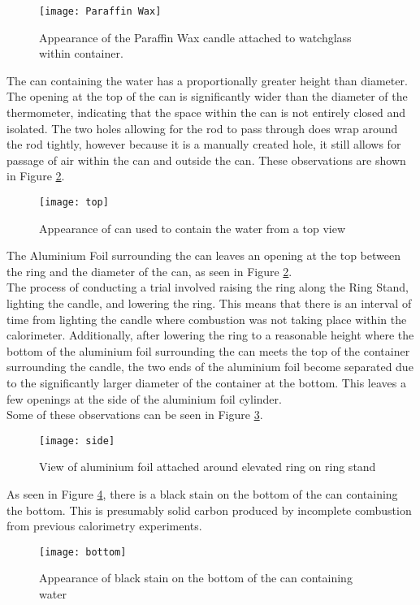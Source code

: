 \documentclass[
	letterpaper, %
	12pt, %
]{CSUniSchoolLabReport}
\begin{document}
\begin{figure}[H] %
    \centering %
    \texttt{[image: Paraffin Wax]} %
    \caption{Appearance of the Paraffin Wax candle attached to watchglass within container.}
    \label{fig:paraffin}
\end{figure}

The can containing the water has a proportionally greater height than diameter.
The opening at the top of the can is significantly wider than the diameter of the thermometer,
indicating that the space within the can is not entirely closed and isolated.
The two holes allowing for the rod to pass through does wrap around the rod
tightly, however because it is a manually created hole, it still allows for passage
of air within the can and outside the can. These observations are shown in
Figure \ref*{fig:cantop}.
\begin{figure}[H]
    \centering
    \texttt{[image: top]}
    \caption{Appearance of can used to contain the water from a top view}
    \label{fig:cantop}
\end{figure}

The Aluminium Foil surrounding the can leaves an opening at the top between
the ring and the diameter of the can, as seen in Figure \ref*{fig:cantop}.
\\
The process of conducting a trial involved raising the ring along the Ring Stand,
lighting the candle, and lowering the ring. This means that there is an interval of time
from lighting the candle where combustion was not taking place within the calorimeter.
Additionally, after lowering the ring to a reasonable height where the bottom of the
aluminium foil surrounding the can meets the top of the container surrounding the
candle, the two ends of the aluminium foil become separated due to the significantly
larger diameter of the container at the bottom. This leaves a few openings at the side
of the aluminium foil cylinder.
\\
Some of these observations can be seen in Figure \ref*{fig:canside}.
\begin{figure}[H]
    \centering
    \texttt{[image: side]}
    \caption{View of aluminium foil attached around elevated ring on ring stand}
    \label{fig:canside}
\end{figure}

As seen in Figure \ref*{fig:canbottom}, there is a black stain on the bottom of the can
containing the bottom. This is presumably solid carbon produced by incomplete combustion
from previous calorimetry experiments.
\begin{figure}[H]
    \centering
    \texttt{[image: bottom]}
    \caption{Appearance of black stain on the bottom of the can containing water}
    \label{fig:canbottom}
\end{figure}
\end{document}
